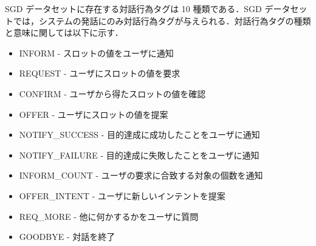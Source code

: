 SGD データセットに存在する対話行為タグは 10 種類である．SGD データセットでは，システムの発話にのみ対話行為タグが与えられる．対話行為タグの種類と意味に関しては以下に示す．
\begin{itemize}
    \item INFORM - スロットの値をユーザに通知
    \item REQUEST - ユーザにスロットの値を要求
    \item CONFIRM - ユーザから得たスロットの値を確認
    \item OFFER - ユーザにスロットの値を提案
    \item NOTIFY\_SUCCESS - 目的達成に成功したことをユーザに通知
    \item NOTIFY\_FAILURE - 目的達成に失敗したことをユーザに通知
    \item INFORM\_COUNT - ユーザの要求に合致する対象の個数を通知
    \item OFFER\_INTENT - ユーザに新しいインテントを提案
    \item REQ\_MORE - 他に何かするかをユーザに質問
    \item GOODBYE - 対話を終了
\end{itemize}
